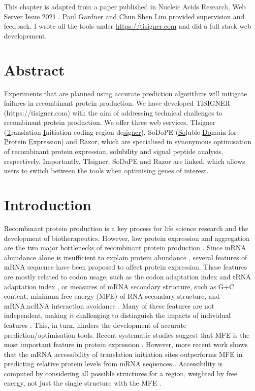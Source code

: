 This chapter is adapted from a paper published in Nucleic Acids Research, Web Server Issue 2021 \cite{bhandaribk2021-nar-gkab175}. Paul Gardner and Chun Shen Lim provided supervision and feedback. I wrote all the tools under \href{https://tisigner.com}{https://tisigner.com} and did a full stack web developement.


\section{Abstract}
Experiments that are planned using accurate prediction algorithms will
mitigate failures in recombinant protein production. We have developed
TISIGNER \\(https://tisigner.com) with the aim of addressing technical
challenges to recombinant protein production. We offer three web
services, TIsigner (\underline{T}ranslation \underline{I}nitiation
coding region de\underline{signer}), SoDoPE (\underline{So}luble
\underline{Do}main for \underline{P}rotein \underline{E}xpression) and
Razor, which are specialised in synonymous optimisation of recombinant
protein expression, solubility and signal peptide analysis,
respectively. Importantly, TIsigner, SoDoPE and Razor are linked, which
allows users to switch between the tools when optimising genes of
interest.


\section{Introduction}

Recombinant protein production is a key process for life science
research and the development of biotherapeutics. However, low protein
expression and aggregation are the two major bottlenecks of recombinant
protein production \cite{Berlec2013-mb,Esposito2006-tj,Hou2018-yd,Kramer2012-wk,Mazurenko2020-pr,Rosano2014-oq,Vihinen2020-ar}.
Since mRNA abundance alone is insufficient to explain protein abundance \cite{Bernstein2002-gg,Abreu2009-zf,Lim2018-rq,Nieuwkoop2020-ph,Taniguchi2010-uq},
several features of mRNA sequence have been proposed to affect protein expression. 
These features are mostly related to codon usage, such as
the codon adaptation index and tRNA adaptation index
\cite{Brule2017-mx,Reis2004-dl,Gutman1989-pn,Sabi2014-je,Sharp1987-ed},
or measures of mRNA secondary structure, such as G+C content, minimum
free energy (MFE) of RNA secondary structure, and mRNA:ncRNA interaction
avoidance
\cite{De_Smit1990-xy,Dvir2013-lq,Kudla2009-tl,Plotkin2011-ak,Tuller2015-ts,Umu2016-zq}.
Many of these features are not independent, making it challenging to
distinguish the impacts of individual features
\cite{mauger2019mrna}. This, in turn, hinders
the development of accurate prediction/optimisation tools. Recent systematic 
studies suggest that MFE is the most important feature in
protein expression \cite{Cambray2018-kn,mauger2019mrna}. However, more 
recent work shows that the mRNA accessibility of translation initiation sites 
outperforms MFE in predicting relative protein levels from mRNA sequences
\cite{Bhandari2021-wd,Terai2020-co}. Accessibility
is computed by considering all possible structures for a region,
weighted by free energy, not just the single structure with the MFE \cite{Bernhart2006-ma}.


